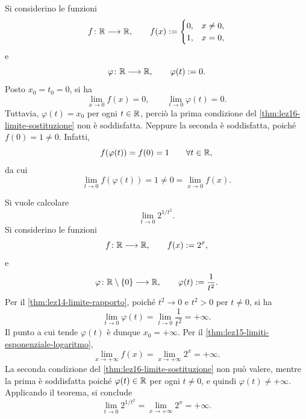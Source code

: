 \begin{example}
\label{ex:lez16-sostituzione-ipotesi}
Si considerino le funzioni
\[
  f\colon\mathbb{R}\longrightarrow\mathbb{R},
  \qquad
  f(x):=
  \begin{cases}
    0, & x\ne0,\\
    1, & x=0,
  \end{cases}
\]
e
\[
  \varphi\colon\mathbb{R}\longrightarrow\mathbb{R},
  \qquad \varphi(t):=0.
\]
Posto \(x_0=t_0=0\), si ha
\[
  \lim_{x\to0}f(x)=0,
  \qquad
  \lim_{t\to0}\varphi(t)=0.
\]
Tuttavia, \(\varphi(t)=x_0\) per ogni \(t\in\mathbb{R}\),
perciò la prima condizione del
\cref{thm:lez16-limite-sostituzione} non è soddisfatta.
Neppure la seconda è soddisfatta, poiché
\(f(0)=1\ne0\). Infatti,
\[
  f(\varphi(t))=f(0)=1
  \qquad\forall t\in\mathbb{R},
\]
da cui
\[
  \lim_{t\to0}f(\varphi(t))=1
  \ne0=\lim_{x\to0}f(x).
\]
\end{example}

\begin{example}
\label{ex:lez16-sostituzione-esponenziale}
Si vuole calcolare
\[
  \lim_{t\to0}2^{1/t^2}.
\]
Si considerino le funzioni
\[
  f\colon\mathbb{R}\longrightarrow\mathbb{R},
  \qquad f(x):=2^x,
\]
e
\[
  \varphi\colon\mathbb{R}\setminus\{0\}\longrightarrow\mathbb{R},
  \qquad \varphi(t):=\frac1{t^2}.
\]
Per il \cref{thm:lez14-limite-rapporto}, poiché
\(t^2\to0\) e \(t^2>0\) per \(t\ne0\), si ha
\[
  \lim_{t\to0}\varphi(t)
  =\lim_{t\to0}\frac1{t^2}=+\infty.
\]
Il punto a cui tende \(\varphi(t)\) è dunque
\(x_0=+\infty\). Per il
\cref{thm:lez15-limiti-esponenziale-logaritmo},
\[
  \lim_{x\to+\infty}f(x)
  =\lim_{x\to+\infty}2^x=+\infty.
\]
La seconda condizione del
\cref{thm:lez16-limite-sostituzione} non può valere,
mentre la prima è soddisfatta poiché
\(\varphi(t)\in\mathbb{R}\) per ogni \(t\ne0\), e quindi
\(\varphi(t)\ne+\infty\).
Applicando il teorema, si conclude
\[
  \lim_{t\to0}2^{1/t^2}
  =\lim_{x\to+\infty}2^x=+\infty.
\]
\end{example}
